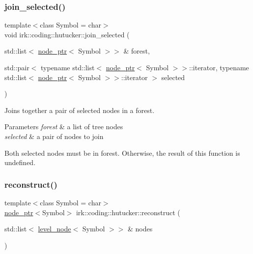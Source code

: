 \subsubsection{\texorpdfstring{join\+\_\+selected()}{join\_selected()}}
{\footnotesize\ttfamily template$<$class Symbol  = char$>$ \\
void irk\+::coding\+::hutucker\+::join\+\_\+selected (\begin{DoxyParamCaption}\item[{std\+::list$<$ \mbox{\hyperlink{namespaceirk_1_1coding_1_1hutucker_aa5d22cfdf05ffec38f2531e0307248fe}{node\+\_\+ptr}}$<$ Symbol $>$$>$ \&}]{forest,  }\item[{std\+::pair$<$ typename std\+::list$<$ \mbox{\hyperlink{namespaceirk_1_1coding_1_1hutucker_aa5d22cfdf05ffec38f2531e0307248fe}{node\+\_\+ptr}}$<$ Symbol $>$$>$\+::iterator, typename std\+::list$<$ \mbox{\hyperlink{namespaceirk_1_1coding_1_1hutucker_aa5d22cfdf05ffec38f2531e0307248fe}{node\+\_\+ptr}}$<$ Symbol $>$$>$\+::iterator $>$}]{selected }\end{DoxyParamCaption})}



Joins together a pair of selected nodes in a forest. 


\begin{DoxyParams}{Parameters}
{\em forest} & a list of tree nodes \\
\hline
{\em selected} & a pair of nodes to join\\
\hline
\end{DoxyParams}
Both {\ttfamily selected} nodes must be in {\ttfamily forest}. Otherwise, the result of this function is undefined. \mbox{\label{namespaceirk_1_1coding_1_1hutucker_adf2fb7ba2277edb34df80da2766493f8}} 
\subsubsection{\texorpdfstring{reconstruct()}{reconstruct()}}
{\footnotesize\ttfamily template$<$class Symbol  = char$>$ \\
\mbox{\hyperlink{namespaceirk_1_1coding_1_1hutucker_aa5d22cfdf05ffec38f2531e0307248fe}{node\+\_\+ptr}}$<$Symbol$>$ irk\+::coding\+::hutucker\+::reconstruct (\begin{DoxyParamCaption}\item[{std\+::list$<$ \mbox{\hyperlink{structirk_1_1coding_1_1hutucker_1_1level__node}{level\+\_\+node}}$<$ Symbol $>$$>$ \&}]{nodes }\end{DoxyParamCaption})}



